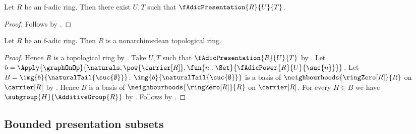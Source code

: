 \begin{proposition}\label{f_adic_ring_has_presentation}
    Let $R$ be an f-adic ring.
    Then there exist $U,T$ such that $\fAdicPresentation{R}{U}{T}$.
\end{proposition}
\begin{proof}
    Follows by .
\end{proof}

\begin{theorem}\label{f_adic_ring_is_nonarchimedean}
    Let $R$ be an f-adic ring.
    Then $R$ is a nonarchimedean topological ring.
\end{theorem}
\begin{proof}
    Hence $R$ is a topological ring by
        .
    Take $U,T$ such that $\fAdicPresentation{R}{U}{T}$ by
        .
    Let $b=\Apply{\graphOnOp}{
        \naturals,\pow{\carrier[R]},
        \fun{n:\Set}{\fAdicPower{R}{U}{\suc{n}}}}$.
    Let $B=\img{b}{\naturalTail{\suc{\emptyset}}}$.
    $\img{b}{\naturalTail{\suc{\emptyset}}}$ is a basis of
        $\neighbourhoods{\ringZero[R]}{R}$ on $\carrier[R]$ by
        .
    Hence $B$ is a basis of $\neighbourhoods{\ringZero[R]}{R}$ on
        $\carrier[R]$.
    For every $H\in B$ we have
        $\subgroup{H}{\AdditiveGroup{R}}$ by
        .
    Follows by
        .
\end{proof}

\subsection{Bounded presentation subsets}

